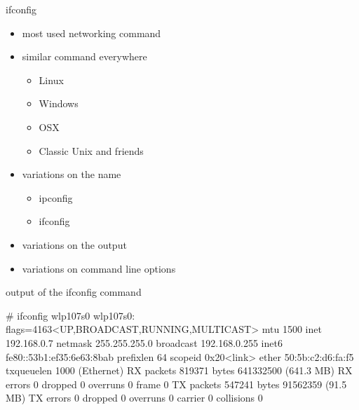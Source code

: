 \cprotect\note{

}

\begin{frame}
	{ifconfig} 
	
	\begin{itemize}
	\item
	most used networking command
	\item 
	similar command everywhere
		\begin{itemize} 
		\item Linux
		\item Windows
		\item OSX
		\item Classic Unix and friends  
		\end{itemize}
	\item variations on the name 
		\begin{itemize} 
		\item ipconfig 
		\item ifconfig 
		\end{itemize}
	\item variations on the output 
	\item variations on command line options 

	\end{itemize} 
\end{frame}

\cprotect\note { 
}

\begin{frame} 
	{output of the ifconfig command}
	\begin{raw}
# ifconfig  wlp107s0 
wlp107s0: flags=4163<UP,BROADCAST,RUNNING,MULTICAST>  mtu 1500
        inet 192.168.0.7  netmask 255.255.255.0  broadcast 192.168.0.255
        inet6 fe80::53b1:ef35:6e63:8bab  prefixlen 64  scopeid 0x20<link>
        ether 50:5b:c2:d6:fa:f5  txqueuelen 1000  (Ethernet)
        RX packets 819371  bytes 641332500 (641.3 MB)
        RX errors 0  dropped 0  overruns 0  frame 0
        TX packets 547241  bytes 91562359 (91.5 MB)
        TX errors 0  dropped 0 overruns 0  carrier 0  collisions 0
	\end{raw}
	
\end{frame}

\cprotect\note{ 
}

